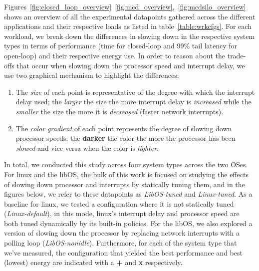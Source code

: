 \label{sec:exp}
Figures~\ref{fig:closed_loop_overview}~\ref{fig:mcd_overview},~\ref{fig:mcdsilo_overview} shows an overview of all the experimental datapoints gathered across the different applications and their respective loads as listed in table~\ref{table:wrkcfgs}. For each workload, we break down the differences in slowing down in the respective system types in terms of performance (time for closed-loop and 99\% tail latency for open-loop) and their respective energy use. In order to reason about the trade-offs that occur when slowing down the processor speed and interrupt delay, we use two graphical mechanism to highlight the differences: 
\begin{enumerate}
    \item The \textit{size} of each point is representative of the degree with which the interrupt delay used; the {\larger[1]\textit{larger}} the size the more interrupt delay is \textit{increased} while the \textit{smaller} the size the more it is \textit{decreased} (faster network interrupts).
    \item The \textit{color gradient} of each point represents the degree of slowing down processor speeds; the \textbf{darker} the color the more the processor has been \textit{slowed} and vice-versa when the color is \textit{lighter}.
\end{enumerate}

In total, we conducted this study across four system types across the two OSes. For linux and the libOS, the bulk of this work is focused on studying the effects of slowing down processor and interrupts by statically tuning them, and in the figures below, we refer to these datapoints as \textit{LibOS-tuned} and \textit{Linux-tuned}. As a baseline for linux, we tested a configuration where it is not statically tuned (\textit{Linux-default}), in this mode, linux's interrupt delay and processor speed are both tuned dynamically by its built-in policies. For the libOS, we also explored a version of slowing down the processor by replacing network interrupts with a polling loop (\textit{LibOS-nonidle}). Furthermore, for each of the system type that we've measured, the configuration that yielded the best performance and best (lowest) energy are indicated with a {\larger[4]\textbf{+}} and {\larger[4]\textbf{x}} respectively.